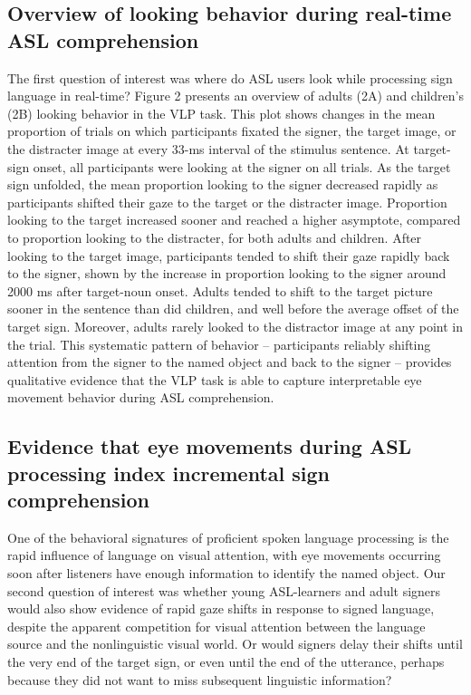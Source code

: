 \documentclass[oneside]{report}
\begin{document}
\hypertarget{overview-of-looking-behavior-during-real-time-asl-comprehension}{%
\subsection{Overview of looking behavior during real-time ASL
comprehension}\label{overview-of-looking-behavior-during-real-time-asl-comprehension}}

The first question of interest was where do ASL users look while
processing sign language in real-time? Figure 2 presents an overview of
adults (2A) and children's (2B) looking behavior in the VLP task. This
plot shows changes in the mean proportion of trials on which
participants fixated the signer, the target image, or the distracter
image at every 33-ms interval of the stimulus sentence. At target-sign
onset, all participants were looking at the signer on all trials. As the
target sign unfolded, the mean proportion looking to the signer
decreased rapidly as participants shifted their gaze to the target or
the distracter image. Proportion looking to the target increased sooner
and reached a higher asymptote, compared to proportion looking to the
distracter, for both adults and children. After looking to the target
image, participants tended to shift their gaze rapidly back to the
signer, shown by the increase in proportion looking to the signer around
2000 ms after target-noun onset. Adults tended to shift to the target
picture sooner in the sentence than did children, and well before the
average offset of the target sign. Moreover, adults rarely looked to the
distractor image at any point in the trial. This systematic pattern of
behavior -- participants reliably shifting attention from the signer to
the named object and back to the signer -- provides qualitative evidence
that the VLP task is able to capture interpretable eye movement behavior
during ASL comprehension.

\hypertarget{evidence-that-eye-movements-during-asl-processing-index-incremental-sign-comprehension}{%
\subsection{Evidence that eye movements during ASL processing index
incremental sign
comprehension}\label{evidence-that-eye-movements-during-asl-processing-index-incremental-sign-comprehension}}

One of the behavioral signatures of proficient spoken language
processing is the rapid influence of language on visual attention, with
eye movements occurring soon after listeners have enough information to
identify the named object. Our second question of interest was whether
young ASL-learners and adult signers would also show evidence of rapid
gaze shifts in response to signed language, despite the apparent
competition for visual attention between the language source and the
nonlinguistic visual world. Or would signers delay their shifts until
the very end of the target sign, or even until the end of the utterance,
perhaps because they did not want to miss subsequent linguistic
information?
\end{document}
